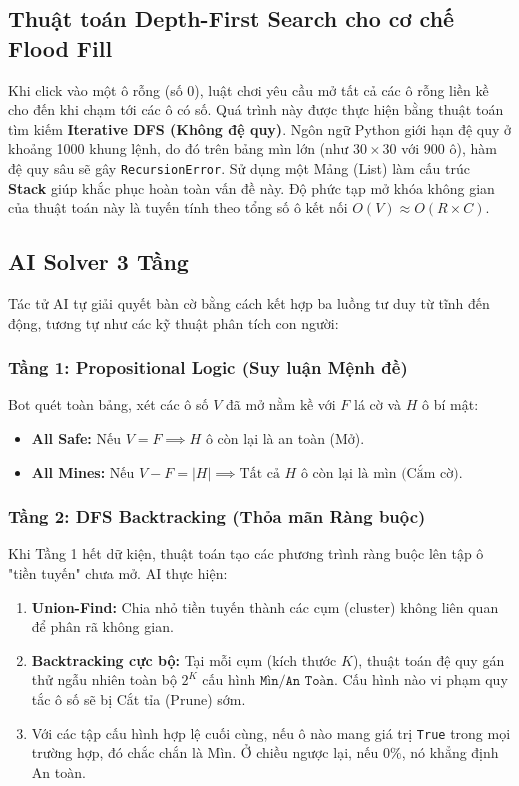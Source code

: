 \subsection{Thuật toán Depth-First Search cho cơ chế Flood Fill}
Khi click vào một ô rỗng (số 0), luật chơi yêu cầu mở tất cả các ô rỗng liền kề cho đến khi chạm tới các ô có số. Quá trình này được thực hiện bằng thuật toán tìm kiếm \textbf{Iterative DFS (Không đệ quy)}. Ngôn ngữ Python giới hạn đệ quy ở khoảng 1000 khung lệnh, do đó trên bảng mìn lớn (như $30\times30$ với 900 ô), hàm đệ quy sâu sẽ gây \texttt{RecursionError}. Sử dụng một Mảng (List) làm cấu trúc \textbf{Stack} giúp khắc phục hoàn toàn vấn đề này.
Độ phức tạp mở khóa không gian của thuật toán này là tuyến tính theo tổng số ô kết nối $O(V) \approx O(R \times C)$.

\subsection{AI Solver 3 Tầng}
Tác tử AI tự giải quyết bàn cờ bằng cách kết hợp ba luồng tư duy từ tĩnh đến động, tương tự như các kỹ thuật phân tích con người:

\subsubsection{Tầng 1: Propositional Logic (Suy luận Mệnh đề)}
Bot quét toàn bảng, xét các ô số $V$ đã mở nằm kề với $F$ lá cờ và $H$ ô bí mật:
\begin{itemize}
    \item \textbf{All Safe:} Nếu $V = F \implies H$ ô còn lại là an toàn (Mở).
    \item \textbf{All Mines:} Nếu $V - F = |H| \implies \text{Tất cả } H \text{ ô còn lại là mìn (Cắm cờ)}$.
\end{itemize}

\subsubsection{Tầng 2: DFS Backtracking (Thỏa mãn Ràng buộc)}
Khi Tầng 1 hết dữ kiện, thuật toán tạo các phương trình ràng buộc lên tập ô "tiền tuyến" chưa mở. AI thực hiện:
\begin{enumerate}
    \item \textbf{Union-Find:} Chia nhỏ tiền tuyến thành các cụm (cluster) không liên quan để phân rã không gian.
    \item \textbf{Backtracking cực bộ:} Tại mỗi cụm (kích thước $K$), thuật toán đệ quy gán thử ngẫu nhiên toàn bộ $2^K$ cấu hình $\texttt{Mìn/An Toàn}$. Cấu hình nào vi phạm quy tắc ô số sẽ bị Cắt tỉa (Prune) sớm.
    \item Với các tập cấu hình hợp lệ cuối cùng, nếu ô nào mang giá trị \texttt{True} trong mọi trường hợp, đó chắc chắn là Mìn. Ở chiều ngược lại, nếu $0\%$, nó khẳng định An toàn.
\end{enumerate}

